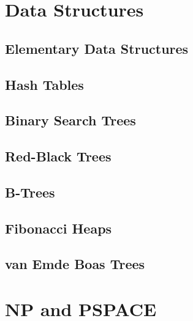 	\chapter{Data Structures}
		\section{Elementary Data Structures}

		\section{Hash Tables}

		\section{Binary Search Trees}

		\section{Red-Black Trees}

		\section{B-Trees}

		\section{Fibonacci Heaps}

		\section{van Emde Boas Trees}

	\chapter{NP and PSPACE}
